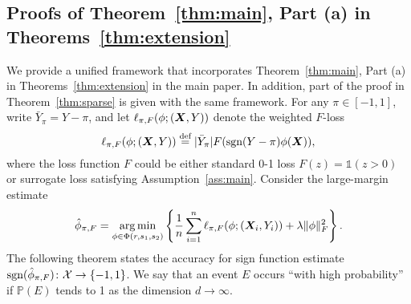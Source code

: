 \documentclass[11pt]{article}
\theoremstyle{plain}
\theoremstyle{definition}
\def\sign{\textup{sgn}}
\def\shift{\bar Y_\pi}
\begin{document}
\subsection{Proofs of Theorem~\ref{thm:main}, Part (a) in Theorems~\ref{thm:extension}}\label{sec:sign}
We provide a unified framework that incorporates Theorem~\ref{thm:main}, Part (a) in Theorems~\ref{thm:extension} in the main paper. In addition, part of the proof in Theorem~\ref{thm:sparse} is given with the same framework.  For any $\pi\in[-1,1]$, write $\shift=Y-\pi$, and let $\ell_{\pi,F}(\phi; (\bm X, Y))$ denote the weighted $F$-loss
\[
\ell_{\pi,F}(\phi; (\mX, Y))\stackrel{\text{def}}{=}|\shift| F(\sign(Y-\pi)\phi(\mX)),
\]
where the loss function $F$ could be either standard 0-1 loss $F(z)=\mathds{1}(z>0)$ or surrogate loss satisfying Assumption~\ref{ass:main}. Consider the large-margin estimate
\begin{align}\label{eq:phi}
\hat \phi_{\pi,F}=\operatorname*{arg\,min}_{\phi \in\Phi(r,s_1,s_2)}\left\{ {1\over n}\sum_{i=1}^n \ell_{\pi,F}(\phi; (\bm X_i,Y_i))+ \lambda \lVert\phi\rVert_F^2\right\}.
\end{align}
The following theorem states the accuracy for sign function estimate $\sign(\hat \phi_{\pi,F})\colon \tX\to\{-1,1\}$. We say that an event $E$ occurs ``with high probability'' if $\mathbb{P}(E)$ tends to 1 as the dimension $d\to \infty$.
\end{document}
